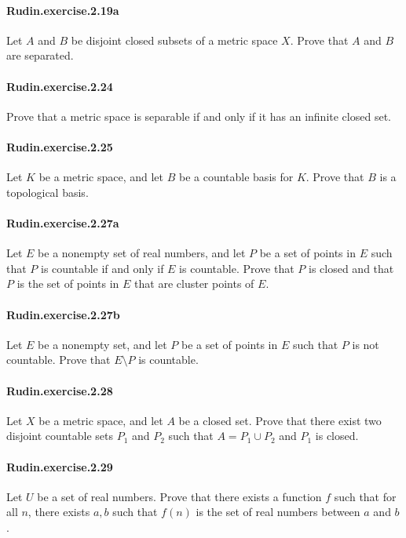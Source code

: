 \documentclass{article}
\begin{document}
\paragraph{Rudin.exercise.2.19a} Let $A$ and $B$ be disjoint closed subsets of a metric space $X$. Prove that $A$ and $B$ are separated.

\paragraph{Rudin.exercise.2.24} Prove that a metric space is separable if and only if it has an infinite closed set.

\paragraph{Rudin.exercise.2.25} Let $K$ be a metric space, and let $B$ be a countable basis for $K$. Prove that $B$ is a topological basis.

\paragraph{Rudin.exercise.2.27a} Let $E$ be a nonempty set of real numbers, and let $P$ be a set of points in $E$ such that $P$ is countable if and only if $E$ is countable. Prove that $P$ is closed and that $P$ is the set of points in $E$ that are cluster points of $E$.

\paragraph{Rudin.exercise.2.27b} Let $E$ be a nonempty set, and let $P$ be a set of points in $E$ such that $P$ is not countable. Prove that $E \setminus P$ is countable.

\paragraph{Rudin.exercise.2.28} Let $X$ be a metric space, and let $A$ be a closed set. Prove that there exist two disjoint countable sets $P_1$ and $P_2$ such that $A = P_1 \cup P_2$ and $P_1$ is closed.

\paragraph{Rudin.exercise.2.29} Let $U$ be a set of real numbers. Prove that there exists a function $f$ such that for all $n$, there exists $a, b$ such that $f(n)$ is the set of real numbers between $a$ and $b$.
\end{document}
